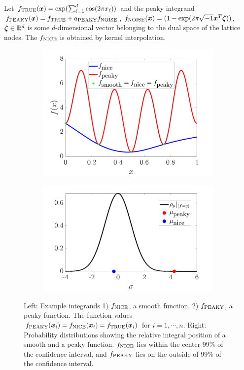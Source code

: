 \documentclass[handout, 10pt,compress,xcolor={usenames,dvipsnames}]{beamer} %
\newcommand{\bm}[1]{\boldsymbol{#1}}
\newcommand{\NICE}{\textup{NICE}}
\newcommand{\PEAKY}{{\textup{PEAKY}}}
\newcommand{\NOISE}{{\textup{NOISE}}}
\newcommand{\TRUE}{\textup{TRUE}}
\newcommand{\vzeta}{{\bm{\zeta}}}
\begin{document}
\begin{frame}{}
\vspace{-7ex}
Let $f_{\TRUE}(\vx) = \exp(\sum_{\ell=1}^{d} \cos(2\pi x_\ell))$ and the peaky integrand $f_{\PEAKY}(\vx) = f_{\TRUE} + a_{\PEAKY} f_{\NOISE}$, $f_{\NOISE}(\vx) = (1 - \exp(2\pi \sqrt{-1} \vx^T \vzeta))$, $\vzeta \in \reals^d$ is some $d$-dimensional vector belonging to the dual space of the lattice nodes. The $f_{\NICE}$ is obtained by kernel interpolation.
\vspace{-4ex}
\begin{figure}[htp]
	\centering
	\begin{subfigure}[b]{0.44\textwidth}
		\includegraphics[width=0.9\linewidth]{../figures/cone_bayes_f_real}
	\end{subfigure}
	\centering
	\begin{subfigure}[b]{0.55\textwidth}
		\includegraphics[width=0.9\linewidth]{../figures/cone_bayes_mu_pdf}
	\end{subfigure}
\caption{Left: Example integrands 1) $f_{\NICE}$, a smooth function, 2) $f_{\PEAKY}$, a peaky function. The function values $f_{\PEAKY}(\vx_i) = f_{\NICE}(\vx_i) = f_{\TRUE}(\vx_i) $ for $i=1, \cdots, n$. 
Right: Probability distributions showing the relative integral position of a smooth and a peaky function. $f_{\NICE}$ lies within the center 99\% of the confidence interval, and $f_{\PEAKY}$ lies on the outside of 99\% of the confidence interval.
}
\end{figure}
\end{frame}
\end{document}
